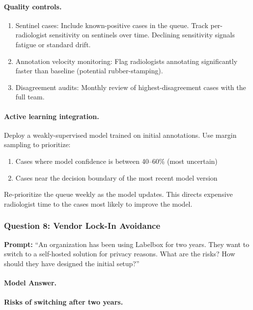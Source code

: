 \paragraph{Quality controls.}
\begin{enumerate}
    \item Sentinel cases: Include known-positive cases in the queue. Track per-radiologist sensitivity on sentinels over time. Declining sensitivity signals fatigue or standard drift.
    \item Annotation velocity monitoring: Flag radiologists annotating significantly faster than baseline (potential rubber-stamping).
    \item Disagreement audits: Monthly review of highest-disagreement cases with the full team.
\end{enumerate}

\paragraph{Active learning integration.}
Deploy a weakly-supervised model trained on initial annotations. Use margin sampling to prioritize:
\begin{enumerate}
    \item Cases where model confidence is between 40--60\% (most uncertain)
    \item Cases near the decision boundary of the most recent model version
\end{enumerate}
Re-prioritize the queue weekly as the model updates. This directs expensive radiologist time to the cases most likely to improve the model.

\subsubsection{Question 8: Vendor Lock-In Avoidance}

\textbf{Prompt:} ``An organization has been using Labelbox for two years. They want to switch to a self-hosted solution for privacy reasons. What are the risks? How should they have designed the initial setup?''

\paragraph{Model Answer.}

\paragraph{Risks of switching after two years.}

